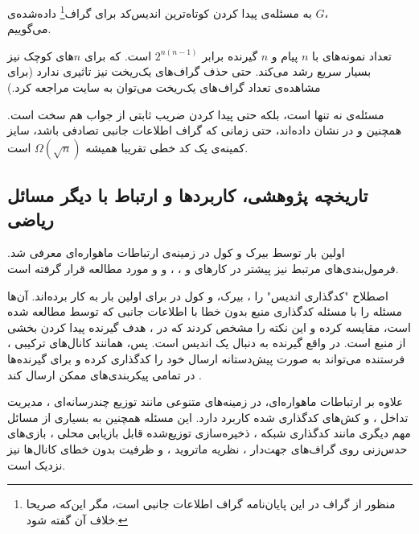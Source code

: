 \begin{notation}
	به مسئله‌ی پیدا کردن کوتاه‌ترین اندیس‌کد برای 
 گراف\footnote{منظور از گراف در این پایان‌نامه گراف اطلاعات جانبی است، مگر این‌که صریحا خلاف آن گفته شود.}
	داده‌شده‌ی 
	$G$،
\\ \icodg 
	می‌گوییم.
\end{notation}
		\begin{remark}
		تعداد نمونه‌های \icod با
		$n$
		پیام و 
		$n$
		گیرنده برابر
		$2^{n(n - 1)}$
		است. که برای
		$n$های
		کوچک نیز بسیار سریع رشد می‌کند. حتی حذف گراف‌های یک‌ریخت نیز تاثیری ندارد (برای مشاهده‌ی تعداد گراف‌های یک‌ریخت می‌توان به سایت \cite{web:unlabeled} مراجعه کرد.)
	
     مسئله‌ی
	\icod
نه تنها	
 \nphard  
 است،
 بلکه حتی پیدا کردن ضریب ثابتی از جواب هم سخت است. همچنین
	و
	در
	\cite{6283850}
	نشان داده‌اند، حتی زمانی که گراف اطلاعات جانبی تصادفی باشد، سایز کمینه‌ی یک کد خطی تقریبا همیشه
	$\Omega(\sqrt{n})$
	است.
		\end{remark}


\subsection{تاریخچه پژوهشی، کاربردها و ارتباط با دیگر مسائل ریاضی}
اولین بار
\icod توسط بیرک و کول 
\cite{25, 26}
 در زمینه‌ی ارتباطات ماهواره‌ای معرفی شد. فرمول‌بندی‌های مرتبط نیز پیشتر در کارهای 
 	و 
  \cite{paper:1455117:Celebiler}،
  ،
  و
\cite{152}
و
\cite{158}
 مورد مطالعه قرار گرفته است.
 
 \noindent
  اصطلاح "کدگذاری اندیس" را 
  ، بیرک،
  و کول در
\cite{4031356}
 برای اولین بار به کار برده‌اند. آن‌ها مسئله \icod را با مسئله کدگذاری منبع بدون خطا با اطلاعات جانبی که توسط
\cite{1055607}
 مطالعه شده است، مقایسه کرده و این نکته را مشخص کردند که در \icod، هدف گیرنده پیدا کردن بخشی از منبع است. در واقع گیرنده به دنبال یک اندیس است. پس، همانند کانال‌های ترکیبی
 \cite{27, 53, 154}،
 فرستنده می‌تواند به صورت پیش‌دستانه ارسال خود را کدگذاری کرده و برای گیرنده‌ها در تمامی پیکربندی‌های ممکن ارسال کند
\cite{48}.

 علاوه بر ارتباطات ماهواره‌ای، \icod در زمینه‌های متنوعی مانند توزیع چندرسانه‌ای 
\cite{114}،
مدیریت تداخل 
\cite{81}،
و کش‌های کدگذاری شده 
\cite{103, 82}
 کاربرد دارد. این مسئله همچنین به بسیاری از مسائل مهم دیگری مانند کدگذاری شبکه 
\cite{122, 61, 59}،
ذخیره‌سازی توزیع‌شده قابل بازیابی محلی 
\cite{108, 128, 13}،
بازی‌های حدس‌زنی روی گراف‌های جهت‌دار 
\cite{122, 162, 13}،
نظریه ماتروید 
\cite{61}،
و ظرفیت بدون خطای کانال‌ها 
\cite{131}
 نیز نزدیک است.
 
